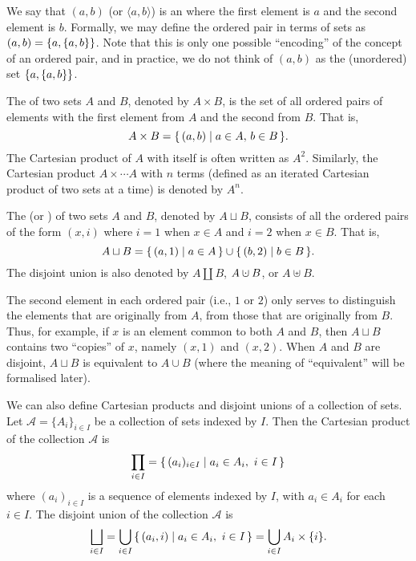 We say that $(a, b)$ (or $\langle a, b \rangle$) is an  where the first element is $a$ and the second element is $b$. Formally, we may define the ordered pair in terms of sets as $(a, b) = \qty{a, \qty{a, b}}$. Note that this is only one possible ``encoding'' of the concept of an ordered pair, and in practice, we do not think of $(a, b)$ as the (unordered) set $\qty{a, \qty{a, b}}$.

The  of two sets $A$ and $B$, denoted by $A \times B$, is the set of all ordered pairs of elements with the first element from $A$ and the second from $B$. That is,
\begin{equation*}
A \times B = \qty{\, (a, b) \mid a \in A,\, b \in B \,}.
\end{equation*}
The Cartesian product of $A$ with itself is often written as $A^2$. Similarly, the Cartesian product $A \times \cdots A$ with $n$ terms (defined as an iterated Cartesian product of two sets at a time) is denoted by $A^n$. 

The  (or ) of two sets $A$ and $B$, denoted by $A \sqcup B$, consists of all the ordered pairs of the form $(x, i)$ where $i = 1$ when $x \in A$ and $i = 2$ when $x \in B$. That is,
\begin{equation*}
A \sqcup B = \qty{\, (a, 1) \mid a \in A \,} \cup \qty{\, (b, 2) \mid b \in B \,}.
\end{equation*}
The disjoint union is also denoted by $A \coprod B$, $A \mathbin{\mathaccent\cdot\cup} B$, or $A \uplus B$.

\begin{Note*}
The second element in each ordered pair (i.e., $1$ or $2$) only serves to distinguish the elements that are originally from $A$, from those that are originally from $B$. Thus, for example, if $x$ is an element common to both $A$ and $B$, then $A \sqcup B$ contains two ``copies'' of $x$, namely $(x, 1)$ and $(x, 2)$. When $A$ and $B$ are disjoint, $A \sqcup B$ is equivalent to $A \cup B$ (where the meaning of ``equivalent'' will be formalised later).
\end{Note*}

We can also define Cartesian products and disjoint unions of a collection of sets. Let $\mathcal A = \{A_i\}_{i \in I}$ be a collection of sets indexed by $I$. Then the Cartesian product of the collection $\mathcal A$ is
\begin{equation*}
\prod_{i \in I} = \qty{\, (a_i)_{i \in I} \mid a_i \in A_i,~ i \in I \,}
\end{equation*}
where $(a_i)_{i \in I}$ is a sequence of elements indexed by $I$, with $a_i \in A_i$ for each $i \in I$. The disjoint union of the collection $\mathcal A$ is
\begin{equation*}
\bigsqcup_{i \in I} = \bigcup_{i \in I} \qty{\, (a_i, i) \mid a_i \in A_i,~ i \in I \,} = \bigcup_{i \in I} A_i \times \{i\}.
\end{equation*}

